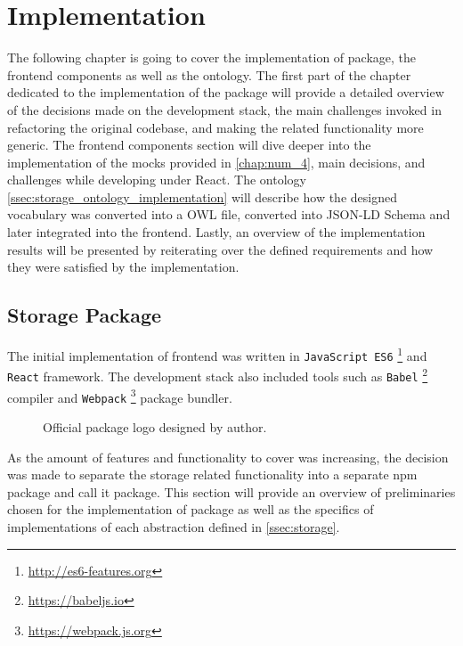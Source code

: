 \chapter{Implementation}
\label{chap:num_5}

The following chapter is going to cover the implementation of \lpas{} package, the frontend components as well as the ontology. The first part of the chapter dedicated to the implementation of the package will provide a detailed overview of the decisions made on the development stack, the main challenges invoked in refactoring the original \lpa{} codebase, and making the \solid{} related functionality more generic. The frontend components section will dive deeper into the implementation of the mocks provided in \autoref{chap:num_4}, main decisions, and challenges while developing under React. The ontology \autoref{ssec:storage_ontology_implementation} will describe how the designed \lpas{} vocabulary was converted into a OWL file, converted into JSON-LD Schema and later integrated into the \lpa{} frontend. Lastly, an overview of the implementation results will be presented by reiterating over the defined \lpa{} requirements and how they were satisfied by the implementation.
 
\section{Storage Package}
\label{ssec_storage_package_implementation}

The initial implementation of \lpa{} frontend was written in \texttt{JavaScript ES6} \footnote{\url{http://es6-features.org}} and \texttt{React} framework. The development stack also included tools such as \texttt{Babel} \footnote{\url{https://babeljs.io}} compiler and \texttt{Webpack} \footnote{\url{https://webpack.js.org}} package bundler. 

\begin{figure}[h]
\centering
{}
\caption{Official \lpas{} package logo designed by author.}
\label{fig:lpas_package_logo}
\end{figure}

As the amount of features and functionality to cover was increasing, the decision was made to separate the \solid{} storage related functionality into a separate npm package and call it \lpas{} package. This section will provide an overview of preliminaries chosen for the implementation of \lpas{} package as well as the specifics of implementations of each abstraction defined in \autoref{ssec:storage}. 

